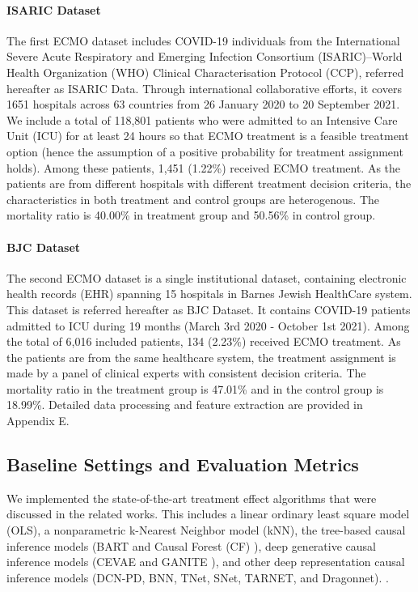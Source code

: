 \paragraph{ISARIC Dataset}
The first ECMO dataset includes COVID-19 individuals from the International Severe Acute Respiratory and Emerging Infection Consortium (ISARIC)–World Health Organization (WHO) Clinical Characterisation Protocol (CCP), referred hereafter as ISARIC Data. Through international collaborative efforts, it covers 1651 hospitals across 63 countries from 26 January 2020 to 20 September 2021. We include a total of 118,801 patients who were admitted to an Intensive Care Unit (ICU) for at least 24 hours so that ECMO treatment is a feasible treatment option (hence the assumption of a positive probability for treatment assignment holds). Among these patients, 1,451 (1.22\%) received ECMO treatment. As the patients are from different hospitals with different treatment decision criteria, the characteristics in both treatment  and control groups are heterogenous. The mortality ratio is 40.00\% in treatment group and 50.56\% in control group. 

\paragraph{BJC Dataset}
The second ECMO dataset is a single institutional dataset, containing electronic health records (EHR) spanning 15 hospitals in Barnes Jewish HealthCare system. This dataset is referred hereafter as BJC Dataset. It contains COVID-19 patients admitted to ICU during 19 months (March 3rd 2020 - October 1st 2021). Among the total of 6,016 included patients, 134 (2.23\%) received ECMO treatment. As the patients are from the same healthcare system, the treatment assignment is made by a panel of clinical experts with consistent decision criteria. The mortality ratio in the treatment group is 47.01\% and in the control group is 18.99\%. Detailed data processing and feature extraction are provided in Appendix E.



\subsection{Baseline Settings and Evaluation Metrics}
We implemented the state-of-the-art treatment effect algorithms that were discussed in the related works. This includes a linear ordinary least square model (OLS), a nonparametric k-Nearest Neighbor model (kNN), the tree-based causal inference models (BART \cite{chipman2010bart} and Causal Forest (CF) \cite{wager2018cf}), deep generative causal inference models (CEVAE and GANITE \cite{louizos2017cevae,yoon2018ganite}), and other deep representation causal inference models (DCN-PD, BNN, TNet, SNet, TARNET, and Dragonnet). \cite{alaa2017dcnpd,johansson2016bnn,yao2018site,shalit2017tarnet,shi2019adapting, curth2021st}.

